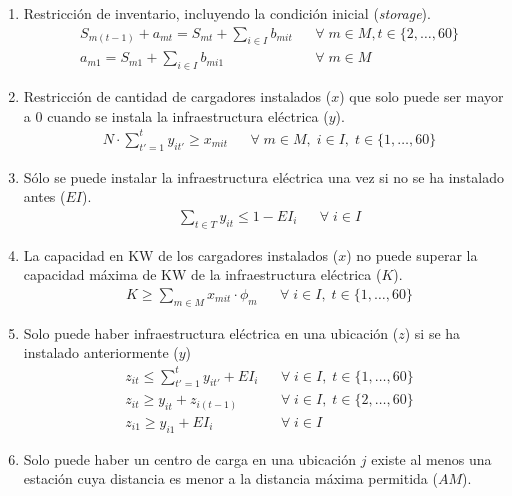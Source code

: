 \documentclass[letterpaper]{article}
\begin{document}
\begin{flushleft}
	\begin{enumerate}
		\item Restricción de inventario, incluyendo la condici\'on inicial (\textit{storage}).
		      \begin{align*}
			       & S_{m(t-1)} + a_{mt} = S_{mt} + \sum_{i \in I} b_{mit} &  & \forall \; m \in M, t \in \{2, \ldots, 60\} \\
			       & a_{m1} = S_{m1} + \sum_{i \in I} b_{mi1}              &  & \forall \; m \in M
		      \end{align*}
		\item Restricción de cantidad de cargadores instalados ($x$) que solo puede ser mayor a $0$ cuando se instala la infraestructura eléctrica ($y$).
		      \begin{align*}
			       & N \cdot \sum_{t'=1}^{t} y_{it'} \geq x_{mit} &  & \forall \; m \in M, \; i \in I,\; t \in \{1, \ldots, 60\}
		      \end{align*}
		\item S\'olo se puede instalar la infraestructura el\'ectrica una vez si no se ha instalado antes ($EI$).
		      \begin{align*}
			       & \sum_{t \in T} y_{it} \leq 1 - EI_i &  & \forall \; i \in I
		      \end{align*}
		\item La capacidad en KW de los cargadores instalados ($x$) no puede superar la capacidad m\'axima de KW de la infraestructura el\'ectrica ($K$).
		      \begin{align*}
			       & K \geq \sum_{m \in M} x_{mit} \cdot \phi_m &  & \forall \; i \in I, \; t \in \{1, \ldots, 60\}
		      \end{align*}
		\item Solo puede haber infraestructura el\'ectrica en una ubicaci\'on ($z$) si se ha instalado anteriormente ($y$)
		      \begin{align*}
			       & z_{it} \leq \sum_{t'=1}^{t} y_{it'} + EI_i &  & \forall \; i \in I, \; t \in \{1, \ldots, 60\} \\
			       & z_{it} \geq y_{it} + z_{i(t-1)}     		&  & \forall \; i \in I, \;t \in \{2, \ldots, 60\}  \\
			       & z_{i1} \geq y_{i1} + EI_i           		&  & \forall \; i \in I
		      \end{align*}
		\item Solo puede haber un centro de carga en una ubicaci\'on $j$ existe al menos una estaci\'on cuya distancia es menor a la distancia m\'axima permitida ($AM$).

\end{enumerate}
\end{flushleft}
\end{document}
